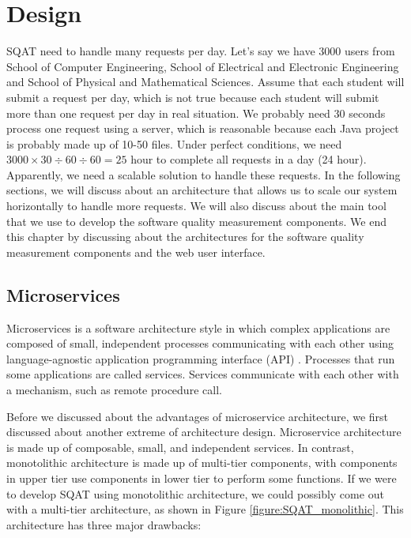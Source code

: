 \chapter{Design}

SQAT need to handle many requests per day. Let's say we have 3000 users from School of Computer Engineering, School of Electrical and Electronic Engineering and School of Physical and Mathematical Sciences. Assume that each student will submit a request per day, which is not true because each student will submit more than one request per day in real situation. We probably need 30 seconds process one request using a server, which is reasonable because each Java project is probably made up of 10-50 files. Under perfect conditions, we need $3000 \times 30 \div 60 \div 60 = 25$ hour to complete all requests in a day (24 hour). Apparently, we need a scalable solution to handle these requests. In the following sections, we will discuss about an architecture that allows us to scale our system horizontally to handle more requests. We will also discuss about the main tool that we use to develop the software quality measurement components. We end this chapter by discussing about the architectures for the software quality measurement components and the web user interface.  

\section{Microservices}

Microservices is a software architecture style in which complex applications are composed of small, independent processes communicating with each other using language-agnostic application programming interface (API) \cite[]{martinfowler2014}. Processes that run some applications are called services. Services communicate with each other with a mechanism, such as remote procedure call. 

Before we discussed about the advantages of microservice architecture, we first discussed about another extreme of architecture design. Microservice architecture is made up of composable, small, and independent services. In contrast, monotolithic architecture is made up of multi-tier components, with components in upper tier use components in lower tier to perform some functions. If we were to develop SQAT using monotolithic architecture, we could possibly come out with a multi-tier architecture, as shown in Figure \ref{figure:SQAT_monolithic}. This architecture has three major drawbacks:

